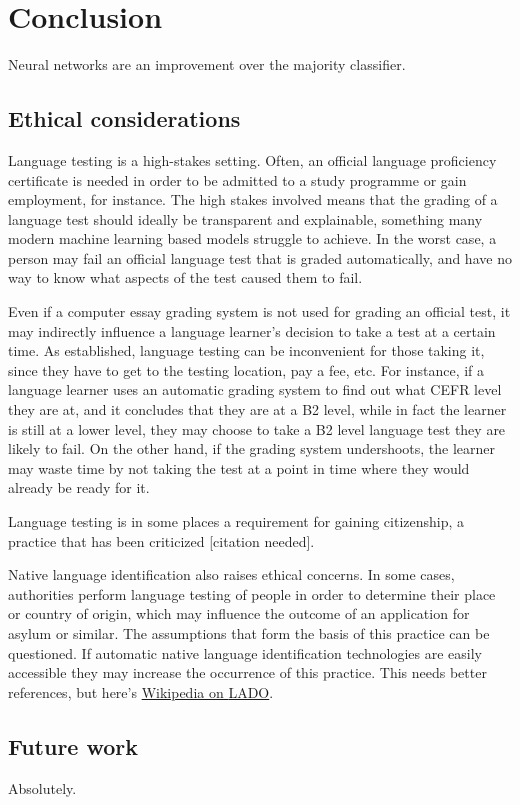\chapter{Conclusion}

Neural networks are an improvement over the majority classifier.


\section{Ethical considerations}

Language testing is a high-stakes setting. Often, an official language
proficiency certificate is needed in order to be admitted to a study
programme or gain employment, for instance. The high stakes involved means
that the grading of a language test should ideally be transparent and
explainable, something many modern machine learning based models struggle to
achieve. In the worst case, a person may fail an official language test that
is graded automatically, and have no way to know what aspects of the test
caused them to fail.

Even if a computer essay grading system is not used for grading an official
test, it may indirectly influence a language learner's decision to take a
test at a certain time. As established, language testing can be inconvenient
for those taking it, since they have to get to the testing location, pay a
fee, etc. For instance, if a language learner uses an automatic grading
system to find out what CEFR level they are at, and it concludes that they
are at a B2 level, while in fact the learner is still at a lower level, they
may choose to take a B2 level language test they are likely to fail. On the
other hand, if the grading system undershoots, the learner may waste time by
not taking the test at a point in time where they would already be ready for
it.

Language testing is in some places a requirement for gaining citizenship, a
practice that has been criticized [citation needed].

Native language identification also raises ethical concerns. In some cases,
authorities perform language testing of people in order to determine their
place or country of origin, which may influence the outcome of an application
for asylum or similar. The assumptions that form the basis of this practice
can be questioned. If automatic native language identification technologies
are easily accessible they may increase the occurrence of this practice. This
needs better references, but here's
\href{https://en.wikipedia.org/wiki/Language_analysis_for_the_determination_of_origin}{Wikipedia
on \ac{LADO}}.


\section{Future work}

Absolutely.
